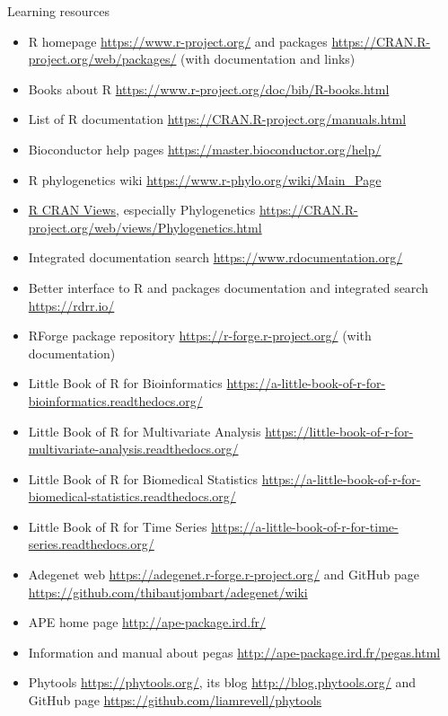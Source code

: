 \documentclass[compress, xelatex, 11pt, xcolor=svgnames, aspectratio=169,
	hyperref={
		bookmarks=true,
		unicode=true,
		colorlinks=true,
		pdftitle={Molecular data in R},
		plainpages=false,
		pdfauthor={Vojtech Zeisek},
		pdfsubject={Course about phylogeny and evolution in R},
		pdfcreator={XeLaTeX},
		pdfkeywords={R, evolution, phylogeny, molecular data},
		linkcolor=Crimson, %
		anchorcolor=Magenta, %
		citecolor=Magenta, %
		filecolor=Magenta, %
		menucolor=Magenta, %
		urlcolor=DodgerBlue, %
		},
	url={hyphens, lowtilde} %
	]{beamer}
\begin{document}
\begin{frame}[allowframebreaks]{Learning resources}
	\begin{itemize}
		\item R homepage \url{https://www.r-project.org/} and packages \url{https://CRAN.R-project.org/web/packages/} (with documentation and links)
		\item Books about R \url{https://www.r-project.org/doc/bib/R-books.html}
		\item List of R documentation \url{https://CRAN.R-project.org/manuals.html}
		\item Bioconductor help pages \url{https://master.bioconductor.org/help/}
		\item R phylogenetics wiki \url{https://www.r-phylo.org/wiki/Main_Page}
		\item \href{https://cran.r-project.org/web/views/}{R CRAN Views}, especially Phylogenetics \url{https://CRAN.R-project.org/web/views/Phylogenetics.html}
		\item Integrated documentation search \url{https://www.rdocumentation.org/}
		\item Better interface to R and packages documentation and integrated search \url{https://rdrr.io/}
		\item RForge package repository \url{https://r-forge.r-project.org/} (with documentation)
		\item Little Book of R for Bioinformatics \url{https://a-little-book-of-r-for-bioinformatics.readthedocs.org/}
		\item Little Book of R for Multivariate Analysis \url{https://little-book-of-r-for-multivariate-analysis.readthedocs.org/}
		\item Little Book of R for Biomedical Statistics \url{https://a-little-book-of-r-for-biomedical-statistics.readthedocs.org/}
		\item Little Book of R for Time Series \url{https://a-little-book-of-r-for-time-series.readthedocs.org/}
		\item Adegenet web \url{https://adegenet.r-forge.r-project.org/} and GitHub page \url{https://github.com/thibautjombart/adegenet/wiki}
		\item APE home page \url{http://ape-package.ird.fr/}
		\item Information and manual about pegas \url{http://ape-package.ird.fr/pegas.html}
		\item Phytools \url{https://phytools.org/}, its blog \url{http://blog.phytools.org/} and GitHub page \url{https://github.com/liamrevell/phytools}

\end{itemize}
\end{frame}
\end{document}
